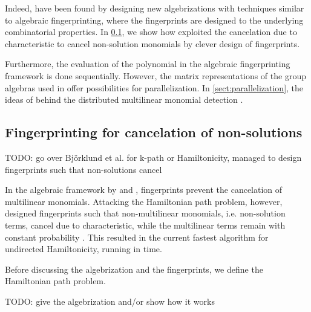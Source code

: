 Indeed,
 have been found by designing new algebrizations with techniques 
similar to algebraic fingerprinting, where the fingerprints are designed to 
the underlying combinatorial properties. In \cref{sect:cancel_nonsolutions}, 
we show how \citeauthor{Björklund14} \cite{Björklund14}
exploited the cancelation due to characteristic to cancel non-solution monomials 
by clever design of fingerprints. 

Furthermore, the evaluation of the polynomial in the algebraic fingerprinting framework is done sequentially. 
However, the matrix representations of the group algebras used in \cite{Williams09} 
offer possibilities for parallelization.
In \cref{sect:parallelization},  the ideas of 
\citeauthor{Midas19} behind the distributed multilinear monomial detection
\cite{Midas19} .

\subsection{Fingerprinting for cancelation of non-solutions}
\label{sect:cancel_nonsolutions}

TODO: go over Björklund et al. for k-path or Hamiltonicity, managed to design fingerprints such that non-solutions cancel

In the algebraic framework by \citeauthor{Koutis08} and \citeauthor{Williams09}, 
fingerprints prevent the cancelation of multilinear monomials. 
Attacking the Hamiltonian path problem, however, \citeauthor{Björklund14} 
designed fingerprints such that non-multilinear monomials, i.e. non-solution terms, 
cancel due to characteristic, while the multilinear terms 
remain with constant probability \cite{Björklund14}. This resulted in the current 
fastest algorithm for undirected Hamiltonicity, running in  time.

Before discussing the algebrization and the fingerprints, 
we define the Hamiltonian path problem.

\begin{problem}
\end{problem}

TODO: give the algebrization and/or show how it works

